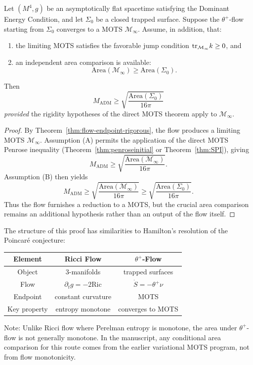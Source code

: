 \begin{theorem}
\label{thm:spacetime-penrose-theta}
Let $(M^4, g)$ be an asymptotically flat spacetime satisfying the Dominant Energy Condition, and let $\Sigma_0$ be a closed trapped surface. Suppose the $\theta^+$-flow starting from $\Sigma_0$ converges to a MOTS $\mathcal{M}_\infty$. Assume, in addition, that:
\begin{enumerate}
    \item[(A)] the limiting MOTS satisfies the favorable jump condition $\mathrm{tr}_{\mathcal{M}_\infty} k \ge 0$, and
    \item[(B)] an independent area comparison is available:
    \[
        \mathrm{Area}(\mathcal{M}_\infty) \ge \mathrm{Area}(\Sigma_0).
    \]
\end{enumerate}
Then
\begin{equation}
\boxed{M_{\mathrm{ADM}} \geq \sqrt{\frac{\mathrm{Area}(\Sigma_0)}{16\pi}}}
\end{equation}
\emph{provided} the rigidity hypotheses of the direct MOTS theorem apply to $\mathcal{M}_\infty$.
\end{theorem}

\begin{proof}
By Theorem~\ref{thm:flow-endpoint-rigorous}, the flow produces a limiting MOTS $\mathcal{M}_\infty$. Assumption (A) permits the application of the direct MOTS Penrose inequality (Theorem~\ref{thm:penroseinitial} or Theorem~\ref{thm:SPI}), giving
\[
    M_{\mathrm{ADM}} \ge \sqrt{\frac{\mathrm{Area}(\mathcal{M}_\infty)}{16\pi}}.
\]
Assumption (B) then yields
\[
    M_{\mathrm{ADM}} \ge \sqrt{\frac{\mathrm{Area}(\mathcal{M}_\infty)}{16\pi}}
    \ge \sqrt{\frac{\mathrm{Area}(\Sigma_0)}{16\pi}}.
\]
Thus the flow furnishes a reduction to a MOTS, but the crucial area comparison remains an additional hypothesis rather than an output of the flow itself.
\end{proof}

\begin{remark}
\label{rem:hamilton-comparison}
The structure of this proof has similarities to Hamilton's resolution of the Poincar\'e conjecture:
\begin{center}
\begin{tabular}{|c|c|c|}
\hline
\textbf{Element} & \textbf{Ricci Flow} & \textbf{$\theta^+$-Flow} \\
\hline
Object & 3-manifolds & trapped surfaces \\
Flow & $\partial_t g = -2\mathrm{Ric}$ & $\dot{S} = -\theta^+ \nu$ \\
Endpoint & constant curvature & MOTS \\
Key property & entropy monotone & converges to MOTS \\
\hline
\end{tabular}
\end{center}
Note: Unlike Ricci flow where Perelman entropy is monotone, the area under $\theta^+$-flow is not generally monotone. In the manuscript, any conditional area comparison for this route comes from the earlier variational MOTS program, not from flow monotonicity.
\end{remark}

